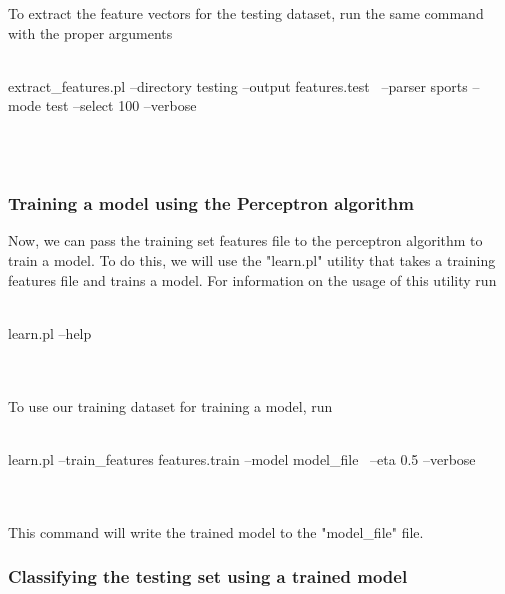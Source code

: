 To extract the feature vectors for the testing dataset, run the same command with the proper arguments
\\
\\
\begin{boxedverbatim}
 extract_features.pl --directory testing --output features.test \
  --parser sports --mode test --select 100 --verbose
\end{boxedverbatim}
\\
\\
\subsubsection{Training a model using the Perceptron algorithm}

Now, we can pass the training set features file to the perceptron algorithm to train a model. To do this, we will use the "learn.pl" utility that takes a training features file and trains a model. For information on the usage of this utility run
\\
\\
\begin{boxedverbatim}
 learn.pl --help
\end{boxedverbatim}
\\
\\
To use our training dataset for training a model, run
\\
\\
\begin{boxedverbatim}
 learn.pl --train_features features.train --model model_file \
 --eta 0.5 --verbose
\end{boxedverbatim}
\\
\\
This command will write the trained model to the "model\_file" file.

\subsubsection{Classifying the testing set using a trained model}

